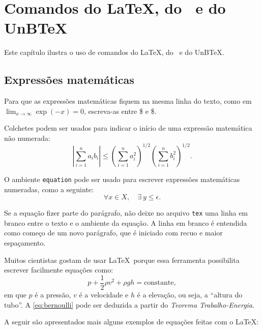 \chapter{Comandos do \LaTeX, do \abnTeX\ e do UnB\TeX}
\label{cap:exemplos}

Este capítulo ilustra o uso de comandos do \LaTeX, do \abnTeX\ e do UnB\TeX.

\section{Expressões matemáticas}
\label{sec:mat}

Para que as expressões matemáticas fiquem na mesma linha do texto, como em $ \lim_{x \to \infty} \exp(-x) = 0 $, escreva-as entre \$ e \$.

Colchetes podem ser usados para indicar o início de uma expressão matemática não numerada:
\[
\left|\sum_{i=1}^n a_ib_i\right|
\le
\left(\sum_{i=1}^n a_i^2\right)^{1/2}
\left(\sum_{i=1}^n b_i^2\right)^{1/2}.
\]

O ambiente \texttt{equation} pode ser usado para escrever expressões matemáticas numeradas, como a seguinte:
\begin{equation}
  \forall x \in X, \quad \exists \: y \leq \epsilon.
\end{equation}

Se a equação fizer parte do parágrafo, não deixe no arquivo \texttt{tex} uma linha em branco entre o texto e o ambiente da equação. A linha em branco é entendida como começo de um novo parágrafo, que é iniciado com recuo e maior espaçamento.

Muitos cientistas gostam de usar \LaTeX\ porque essa ferramenta possibilita escrever facilmente equações como:
\begin{equation}
p+\frac{1}{2}{\rho}v^2+{\rho}gh = \text{constante},
\label{eq:bernoulli}
\end{equation}
em que $p$ é a pressão, $v$ é a velocidade e $h$ é a elevação, ou seja, a ``altura do tubo''. A \cref{eq:bernoulli} pode ser deduzida a partir do \textit{Teorema Trabalho-Energia}.


A seguir são apresentados mais alguns exemplos de equações feitas com o \LaTeX:

